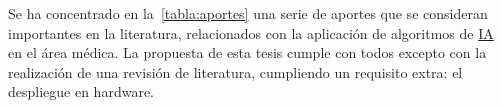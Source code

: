 Se ha concentrado en la~\autoref{tabla:aportes} una serie de aportes que se consideran
importantes en la literatura, relacionados con la aplicación de algoritmos de
\hyperlink{abbr}{IA} en el área médica. La propuesta de esta tesis cumple con
todos excepto con la realización de una revisión de literatura, cumpliendo un
requisito extra: el despliegue en hardware.

